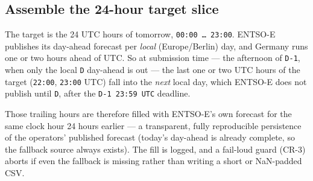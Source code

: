 \documentclass[
  english,
  letterpaper,
]{scrbook}
\begin{document}
\subsection{Assemble the 24-hour target slice}\label{sec-entsoe-extract}

The target is the 24 UTC hours of tomorrow, \texttt{00:00\ …\ 23:00}.
ENTSO-E publishes its day-ahead forecast per \emph{local}
(Europe/Berlin) day, and Germany runs one or two hours ahead of UTC. So
at submission time --- the afternoon of \texttt{D-1}, when only the
local \texttt{D} day-ahead is out --- the last one or two UTC hours of
the target (\texttt{22:00}, \texttt{23:00} UTC) fall into the
\emph{next} local day, which ENTSO-E does not publish until \texttt{D},
after the \texttt{D-1\ 23:59\ UTC} deadline.

Those trailing hours are therefore filled with ENTSO-E's own forecast
for the same clock hour 24 hours earlier --- a transparent, fully
reproducible persistence of the operators' published forecast (today's
day-ahead is already complete, so the fallback source always exists).
The fill is logged, and a fail-loud guard (CR-3) aborts if even the
fallback is missing rather than writing a short or NaN-padded CSV.
\end{document}
